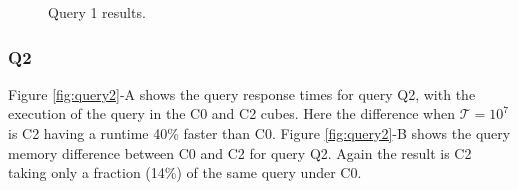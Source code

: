 \begin{figure}[H]
  \caption{Query 1 results.}\label{fig:query1}
  \vspace{6mm}
  \begin{center}
  \end{center}
  \vspace{2mm}
\end{figure}

\hypertarget{q2-1}{%
\subsubsection{Q2}\label{q2-1}}

Figure \ref{fig:query2}-A shows the query response times for query Q2, with the execution of the query in the C0 and C2 cubes.
Here the difference when \(\mathcal{T} =\ensuremath{10^{7}}\) is C2 having a runtime 40\% faster than C0.
Figure \ref{fig:query2}-B shows the query memory difference between C0 and C2 for query Q2.
Again the result is C2 taking only a fraction (14\%) of the same query under C0.

